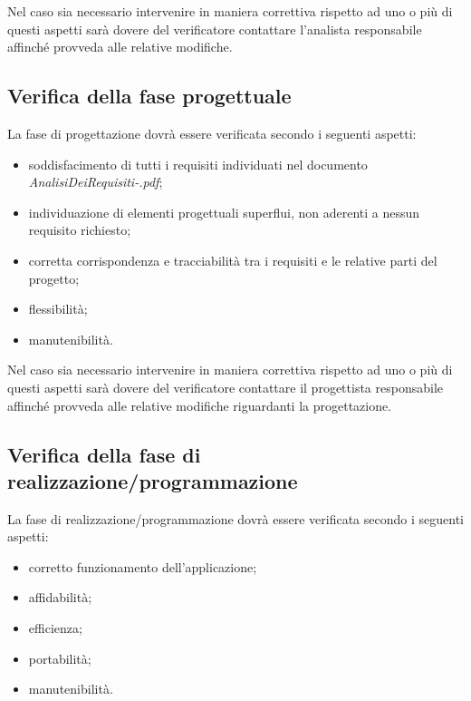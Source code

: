 Nel caso sia necessario intervenire in maniera correttiva rispetto ad uno o
pi\`u di questi aspetti sar\`a dovere del verificatore contattare l'analista
responsabile affinch\'e provveda alle relative modifiche.



\subsection{Verifica della fase progettuale}

La fase di progettazione dovr\`a essere verificata secondo i seguenti aspetti:

\begin{itemize}

\item soddisfacimento di tutti i requisiti individuati nel documento
\emph{AnalisiDeiRequisiti-\versioneAR.pdf};
\item individuazione di elementi progettuali superflui, non aderenti a nessun
requisito richiesto;
\item corretta corrispondenza e tracciabilit\`a tra i requisiti e le relative
parti del progetto;
\item flessibilit\`a;
\item manutenibilit\`a.

\end{itemize}

Nel caso sia necessario intervenire in maniera correttiva rispetto ad uno o
pi\`u di questi aspetti sar\`a dovere del verificatore contattare il progettista
responsabile affinch\'e provveda alle relative modifiche riguardanti la progettazione.

\subsection{Verifica della fase di realizzazione/programmazione}

La fase di realizzazione/programmazione dovr\`a essere verificata secondo i seguenti aspetti:
\begin{itemize}
\item corretto funzionamento dell'applicazione;
\item affidabilit\`a;
\item efficienza;
\item portabilit\`a;
\item manutenibilit\`a.

\end{itemize}

